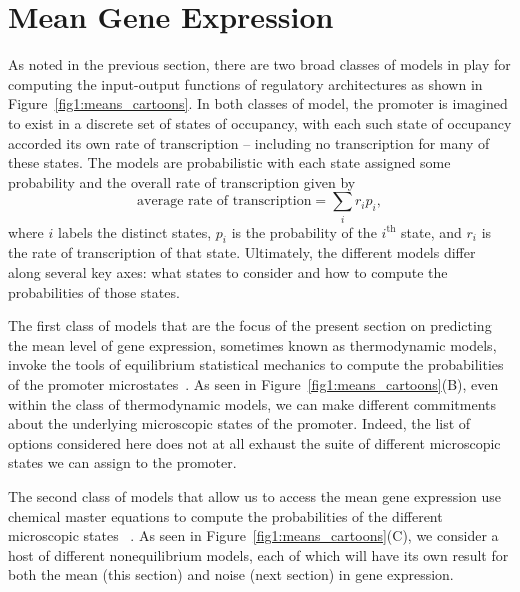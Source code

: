 \section{Mean Gene Expression}\label{section_02_means}

As noted in the previous section, there are two broad classes of models in play
for computing the input-output functions of regulatory architectures as shown in
Figure~\ref{fig1:means_cartoons}. In both classes of model, the promoter is
imagined to exist in a discrete set of states of occupancy, with each such state
of occupancy accorded its own rate of transcription -- including no 
transcription for many of these states. The models are probabilistic with each
state assigned some probability and the overall rate of transcription given by 
\begin{equation}
\mbox{average rate of transcription} = \sum_i r_i p_i,
\label{eq:transcrip_prop_pbound}
\end{equation}
where $i$ labels the distinct states, $p_i$ is the probability of the
$i^{\text{th}}$ state, and $r_i$ is the rate of transcription of that state.
Ultimately, the different models differ along several key axes: what states to
consider and how to compute the probabilities of those states.

The first class of models that are the focus of the present section on
predicting the mean level of gene expression, sometimes known as thermodynamic
models, invoke the tools of equilibrium statistical mechanics to compute the
probabilities of the promoter microstates~\cite{Ackers1982, Shea1985,
Buchler2003, Vilar2003a, Vilar2003b, Bintu2005a, Bintu2005c, Gertz2009,
Sherman2012, Saiz2013}. As seen in Figure~\ref{fig1:means_cartoons}(B), even
within the class of thermodynamic models, we can make different commitments
about the underlying microscopic states of the promoter.  Indeed, the list of
options considered here does not at all exhaust the suite of different
microscopic states we can assign to the promoter.

The second class of models that allow us to access the mean gene expression use
chemical master equations to compute the probabilities of the different
microscopic states ~\cite{Ko1991, Peccoud1995, Record1996, Kepler2001,
Sanchez2008, Shahrezaei2008, Sanchez2011, Michel2010}. As seen in
Figure~\ref{fig1:means_cartoons}(C), we consider a host of different
nonequilibrium models, each of which will have its own result for both the mean
(this section) and noise (next section) in gene expression.

